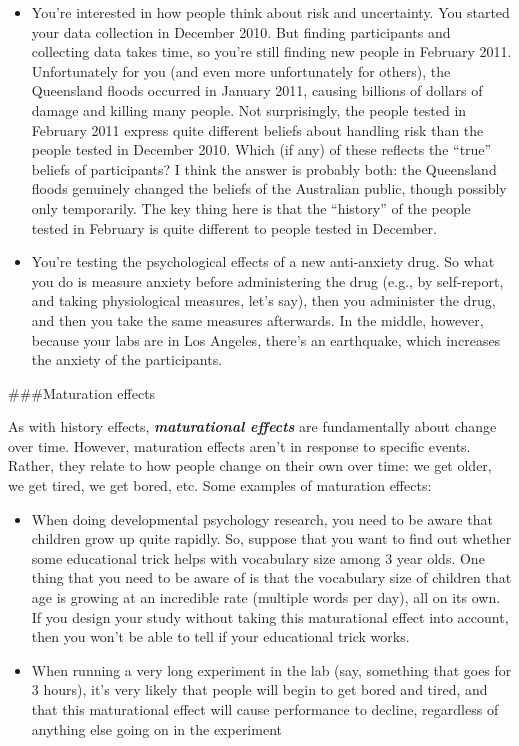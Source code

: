 \documentclass[]{book}
\providecommand{\tightlist}{%
  \setlength{\itemsep}{0pt}\setlength{\parskip}{0pt}}
\begin{document}
\begin{itemize}
\tightlist
\item
  You're interested in how people think about risk and uncertainty. You started your data collection in December 2010. But finding participants and collecting data takes time, so you're still finding new people in February 2011. Unfortunately for you (and even more unfortunately for others), the Queensland floods occurred in January 2011, causing billions of dollars of damage and killing many people. Not surprisingly, the people tested in February 2011 express quite different beliefs about handling risk than the people tested in December 2010. Which (if any) of these reflects the ``true'' beliefs of participants? I think the answer is probably both: the Queensland floods genuinely changed the beliefs of the Australian public, though possibly only temporarily. The key thing here is that the ``history'' of the people tested in February is quite different to people tested in December.
\item
  You're testing the psychological effects of a new anti-anxiety drug. So what you do is measure anxiety before administering the drug (e.g., by self-report, and taking physiological measures, let's say), then you administer the drug, and then you take the same measures afterwards. In the middle, however, because your labs are in Los Angeles, there's an earthquake, which increases the anxiety of the participants.
\end{itemize}

\#\#\#Maturation effects

As with history effects, \textbf{\emph{maturational effects}} are fundamentally about change over time. However, maturation effects aren't in response to specific events. Rather, they relate to how people change on their own over time: we get older, we get tired, we get bored, etc. Some examples of maturation effects:

\begin{itemize}
\tightlist
\item
  When doing developmental psychology research, you need to be aware that children grow up quite rapidly. So, suppose that you want to find out whether some educational trick helps with vocabulary size among 3 year olds. One thing that you need to be aware of is that the vocabulary size of children that age is growing at an incredible rate (multiple words per day), all on its own. If you design your study without taking this maturational effect into account, then you won't be able to tell if your educational trick works.
\item
  When running a very long experiment in the lab (say, something that goes for 3 hours), it's very likely that people will begin to get bored and tired, and that this maturational effect will cause performance to decline, regardless of anything else going on in the experiment
\end{itemize}
\end{document}
